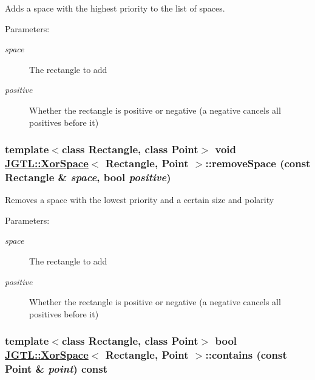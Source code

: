 Adds a space with the highest priority to the list of spaces. \begin{Desc}
\item[Parameters:]
\begin{description}
\item[{\em space}]The rectangle to add \item[{\em positive}]Whether the rectangle is positive or negative (a negative cancels all positives before it) \end{description}
\end{Desc}
\hypertarget{class_j_g_t_l_1_1_xor_space_ade3a68cc488df5f40a33df407887c2f}{
\subsubsection[removeSpace]{\setlength{\rightskip}{0pt plus 5cm}template$<$class Rectangle, class Point$>$ void \hyperlink{class_j_g_t_l_1_1_xor_space}{JGTL::Xor\-Space}$<$ Rectangle, Point $>$::remove\-Space (const Rectangle \& {\em space}, bool {\em positive})}}
\label{class_j_g_t_l_1_1_xor_space_ade3a68cc488df5f40a33df407887c2f}


Removes a space with the lowest priority and a certain size and polarity \begin{Desc}
\item[Parameters:]
\begin{description}
\item[{\em space}]The rectangle to add \item[{\em positive}]Whether the rectangle is positive or negative (a negative cancels all positives before it) \end{description}
\end{Desc}
\hypertarget{class_j_g_t_l_1_1_xor_space_327d98abef98ac5263a081a96cdc12ec}{
\subsubsection[contains]{\setlength{\rightskip}{0pt plus 5cm}template$<$class Rectangle, class Point$>$ bool \hyperlink{class_j_g_t_l_1_1_xor_space}{JGTL::Xor\-Space}$<$ Rectangle, Point $>$::contains (const Point \& {\em point}) const}}
\label{class_j_g_t_l_1_1_xor_space_327d98abef98ac5263a081a96cdc12ec}


